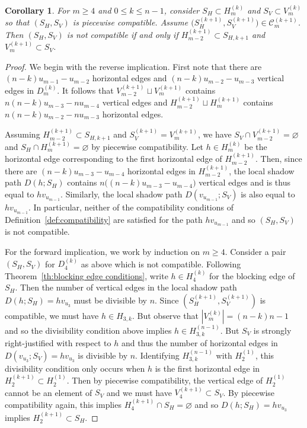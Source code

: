 \documentclass{amsart}
\newtheorem{corollary}[theorem]{Corollary}
\numberwithin{equation}{section}
\newcommand{\cC}{\mathcal{C}}
\begin{document}
\begin{corollary}
  For $m\ge4$ and $0\le k\le n-1$, consider $S_H\subset H_m^{(k)}$ and $S_V\subset V_m^{(k)}$ so that $(S_H,S_V)$ is piecewise compatible.
  Assume $\big(S_H^{(k+1)},S_V^{(k+1)}\big)\in\cC_m^{(k+1)}$.
  Then $(S_H,S_V)$ is not compatible if and only if $H_{m-2}^{(k+1)}\subset S_{H,k+1}$ and $V_m^{(k+1)}\subset S_V$.
\end{corollary}
\begin{proof}
  We begin with the reverse implication.
  First note that there are $(n-k)u_{m-1}-u_{m-2}$ horizontal edges and $(n-k)u_{m-2}-u_{m-3}$ vertical edges in $D_m^{(k)}$. 
  It follows that $V_{m-2}^{(k+1)}\sqcup V_m^{(k+1)}$ contains $n(n-k)u_{m-3}-nu_{m-4}$ vertical edges and $H_{m-2}^{(k+1)}\sqcup H_m^{(k+1)}$ contains $n(n-k)u_{m-2}-nu_{m-3}$ horizontal edges.

  Assuming $H_{m-2}^{(k+1)}\subset S_{H,k+1}$ and $S_V^{(k+1)}=V_m^{(k+1)}$, we have $S_V\cap V_{m-2}^{(k+1)}=\varnothing$ and $S_H\cap H_m^{(k+1)}=\varnothing$ by piecewise compatibility.
  Let $h\in H_m^{(k)}$ be the horizontal edge corresponding to the first horizontal edge of $H_{m-2}^{(k+1)}$.
  Then, since there are $(n-k)u_{m-3}-u_{m-4}$ horizontal edges in $H_{m-2}^{(k+1)}$, the local shadow path $D(h;S_H)$ contains $n\big((n-k)u_{m-3}-u_{m-4}\big)$ vertical edges and is thus equal to $hv_{u_{m-1}}$.
  Similarly, the local shadow path $D(v_{u_{m-1}};S_V)$ is also equal to $hv_{u_{m-1}}$.
  In particular, neither of the compatibility conditions of Definition~\ref{def:compatibility} are satisfied for the path $hv_{u_{m-1}}$ and so $(S_H,S_V)$ is not compatible.

  For the forward implication, we work by induction on $m\ge4$.
  Consider a pair $(S_H,S_V)$ for $D_4^{(k)}$ as above which is not compatible.
  Following Theorem~\ref{th:blocking edge conditions}, write $h\in H_4^{(k)}$ for the blocking edge of $S_H$.
  Then the number of vertical edges in the local shadow path $D(h;S_H)=hv_{u_3}$ must be divisible by $n$. 
  Since $(S_H^{(k+1)},S_V^{(k+1)})$ is compatible, we must have $h\in H_{3,k}$.
  But observe that $|V_m^{(k)}|=(n-k)n-1$ and so the divisibility condition above implies $h\in H_{3,k}^{(n-1)}$.
  But $S_V$ is strongly right-justified with respect to $h$ and thus the number of horizontal edges in $D(v_{u_3};S_V)=hv_{u_3}$ is divisible by $n$.
  Identifying $H_{3,k}^{(n-1)}$ with $H_2^{(1)}$, this divisibility condition only occurs when $h$ is the first horizontal edge in $H_2^{(k+1)}\subset H_2^{(1)}$.
  Then by piecewise compatibility, the vertical edge of $H_2^{(1)}$ cannot be an element of $S_V$ and we must have $V_4^{(k+1)}\subset S_V$.
  By piecewise compatibility again, this implies $H_4^{(k+1)}\cap S_H=\varnothing$ and so $D(h;S_H)=hv_{u_3}$ implies $H_2^{(k+1)}\subset S_H$.


\end{proof}
\end{document}
